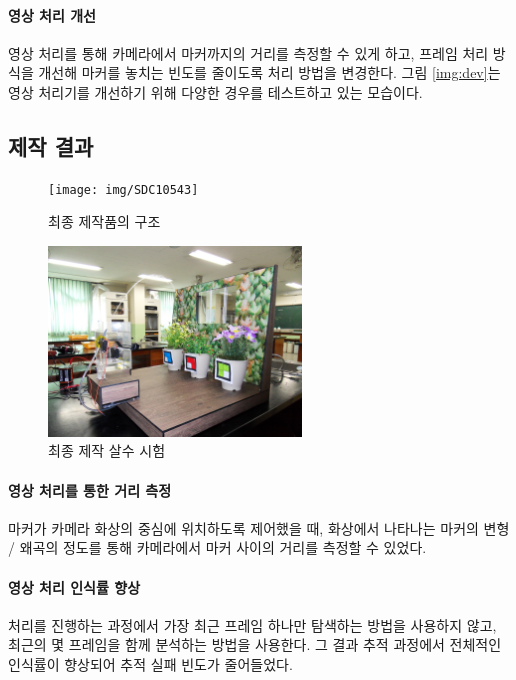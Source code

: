 \documentclass[chapter,11pt,oneside,openany]{xoblivoir}
\begin{document}
\paragraph{영상 처리 개선}
영상 처리를 통해 카메라에서 마커까지의 거리를 측정할 수 있게 하고,
프레임 처리 방식을 개선해 마커를 놓치는 빈도를 줄이도록 처리 방법을 변경한다.
그림 \ref{img:dev}는 영상 처리기를 개선하기 위해 다양한 경우를 테스트하고 있는 모습이다.


\subsection{제작 결과}

\begin{figure}[ht]
\centering
\texttt{[image: img/SDC10543]}
\caption{최종 제작품의 구조}
\end{figure}

\begin{figure}[ht]
\centering
\includegraphics[width=0.6\textwidth]{img/SDC10540}
\caption{최종 제작 살수 시험}
\end{figure}

\paragraph{영상 처리를 통한 거리 측정}
마커가 카메라 화상의 중심에 위치하도록 제어했을 때,
화상에서 나타나는 마커의 변형 / 왜곡의 정도를 통해
카메라에서 마커 사이의 거리를 측정할 수 있었다.

\paragraph{영상 처리 인식률 향상}
처리를 진행하는 과정에서 가장 최근 프레임 하나만 탐색하는 방법을 사용하지 않고,
최근의 몇 프레임을 함께 분석하는 방법을 사용한다.
그 결과 추적 과정에서 전체적인 인식률이 향상되어 추적 실패 빈도가 줄어들었다.
\end{document}

